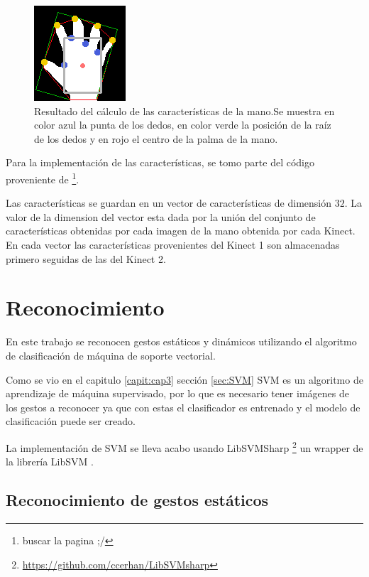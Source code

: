 \begin{figure}[h!]
\begin{center} 
\includegraphics[scale=1]{./Figures/250_Dedos.png}
\end{center}
\caption{Resultado del cálculo de las características de la mano.Se muestra en color azul la punta de los dedos, en color verde la posición de la raíz de los dedos y en rojo el centro de la palma de la mano.}
\label{fig:FeaturesOfHand}
\end{figure}

Para la implementación de las características, se tomo parte del código proveniente de \footnote{buscar la pagina ;/}. 

Las características se guardan en un vector de características de dimensión $32$. La valor de la dimension del vector esta dada por la unión del conjunto de características obtenidas por cada imagen de la mano  obtenida por cada Kinect. En cada vector las características provenientes del Kinect 1 son almacenadas primero seguidas de las del Kinect 2.



\section{Reconocimiento}\label{sec:ReconocimientoSystem}

En este trabajo se reconocen gestos estáticos y dinámicos utilizando el algoritmo de clasificación de máquina de soporte vectorial.  

Como se vio en el capitulo \ref{capit:cap3} sección \ref{sec:SVM} SVM es un algoritmo de aprendizaje de máquina supervisado, por lo que es necesario tener imágenes de los gestos a reconocer ya que con estas el clasificador es entrenado y el modelo de clasificación puede ser creado. 

La implementación de SVM se lleva acabo usando LibSVMSharp \footnote{\url{https://github.com/ccerhan/LibSVMsharp}} un wrapper de la librería LibSVM \citep{Chang2011}.

\subsection{Reconocimiento de gestos estáticos}\label{RecognitionEstatic}

